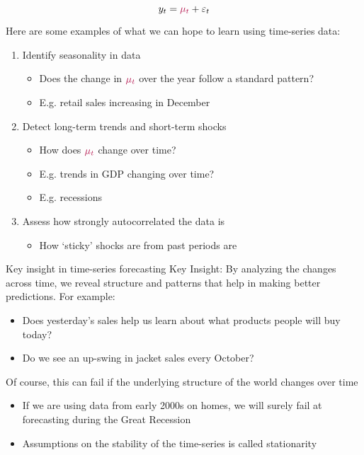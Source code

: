 \documentclass[aspectratio=169,t,11pt,table]{beamer}
\begin{document}
\begin{frame}{}
  $$
    y_t = {\color[HTML]{B3114B} \mu_t} + \varepsilon_t
  $$
  
  Here are some examples of what we can hope to learn using time-series data:
  \begin{enumerate}
    \item Identify \alert{seasonality} in data 
    \begin{itemize}
      \item Does the change in ${\color[HTML]{B3114B} \mu_t}$ over the year follow a standard pattern?
      \item E.g. retail sales increasing in December
    \end{itemize}
    
    \medskip
    \item Detect long-term \alert{trends} and \alert{short-term shocks}
    \begin{itemize}
      \item How does ${\color[HTML]{B3114B} \mu_t}$ change over time? 

      \item E.g. trends in GDP changing over time?
      
      \item E.g. recessions
    \end{itemize}
    
    \medskip
    \item Assess how \alert{strongly autocorrelated} the data is 
    \begin{itemize}
      \item How `sticky' shocks are from past periods are
    \end{itemize}
  \end{enumerate}
\end{frame}


\begin{frame}{Key insight in time-series forecasting}
  \alert{Key Insight}: By analyzing the changes across time, we reveal structure and patterns that help in making better predictions. 
  For example:
  \begin{itemize}
    \item Does yesterday's sales help us learn about what products people will buy today?
    \item Do we see an up-swing in jacket sales every October?
  \end{itemize}
  
  \pause
  \bigskip
  Of course, this can fail if the underlying structure of the world changes over time
  \begin{itemize}
    \item If we are using data from early 2000s on homes, we will surely fail at forecasting during the Great Recession
    
    \item Assumptions on the stability of the time-series is called \alert{stationarity} 
  \end{itemize}  
\end{frame}
\end{document}
